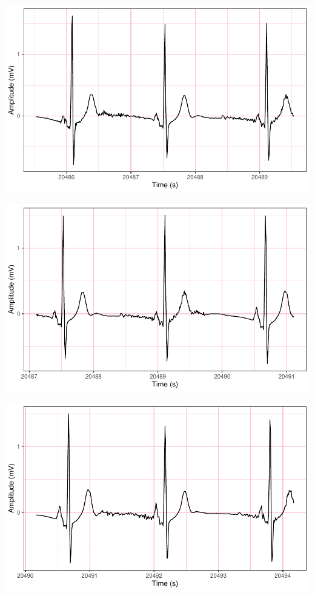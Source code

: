 \documentclass[
]{article}
\begin{document}
\begin{center}\includegraphics{report_files/figure-latex/abnormal-interval-45} \end{center}

\begin{center}\includegraphics{report_files/figure-latex/abnormal-interval-46} \end{center}

\begin{center}\includegraphics{report_files/figure-latex/abnormal-interval-47} \end{center}
\end{document}

